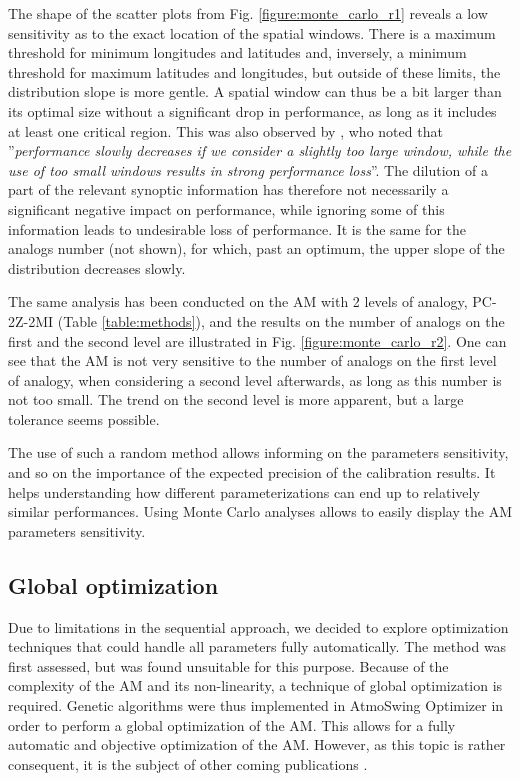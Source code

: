 \documentclass[review]{elsarticle}
\begin{document}
The shape of the scatter plots from Fig. \ref{figure:monte_carlo_r1} reveals a low sensitivity as to the exact location of the spatial windows. There is a maximum threshold for minimum longitudes and latitudes and, inversely, a minimum threshold for maximum latitudes and longitudes, but outside of these limits, the distribution slope is more gentle. A spatial window can thus be a bit larger than its optimal size without a significant drop in performance, as long as it includes at least one critical region. This was also observed by \citet{Bontron2004}, who noted that ''\textit{performance slowly decreases if we consider a slightly too large window, while the use of too small windows results in strong performance loss}''. The dilution of a part of the relevant synoptic information has therefore not necessarily a significant negative impact on performance, while ignoring some of this information leads to undesirable loss of performance. It is the same for the analogs number (not shown), for which, past an optimum, the upper slope of the distribution decreases slowly.

The same analysis has been conducted on the AM with 2 levels of analogy, PC-2Z-2MI (Table \ref{table:methods}), and the results on the number of analogs on the first and the second level are illustrated in Fig. \ref{figure:monte_carlo_r2}. One can see that the AM is not very sensitive to the number of analogs on the first level of analogy, when considering a second level afterwards, as long as this number is not too small. The trend on the second level is more apparent, but a large tolerance seems possible.

The use of such a random method allows informing on the parameters sensitivity, and so on the importance of the expected precision of the calibration results. It helps understanding how different parameterizations can end up to relatively similar performances. Using Monte Carlo analyses allows to easily display the AM parameters sensitivity. 


\subsection{Global optimization}
\label{sec:atmoswing-optimization}

Due to limitations in the sequential approach, we decided to explore optimization techniques that could handle all parameters fully automatically. The \citet{Nelder1965a} method was first assessed, but was found unsuitable for this purpose. Because of the complexity of the AM and its non-linearity, a technique of global optimization is required. Genetic algorithms were thus implemented in AtmoSwing Optimizer in order to perform a global optimization of the AM. This allows for a fully automatic and objective optimization of the AM. However, as this topic is rather consequent, it is the subject of other coming publications \cite[see][]{Horton2016a, Horton2016b}.
\end{document}
